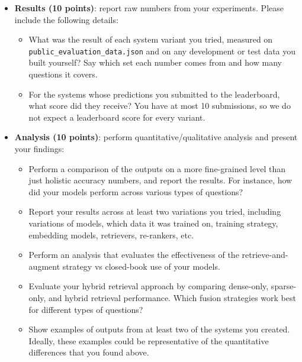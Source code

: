 \documentclass[11pt]{article}
\begin{document}
\begin{itemize}[leftmargin=2em]
\begin{itemize}[leftmargin=1.6em]
\begin{itemize}[nosep, leftmargin=1.4em]
            variations (more is welcome). This can include variations of models, which data it was
            trained on, training strategy, embedding models, retrievers, re-rankers, etc.
          \item What was your justification for trying these methods?
        \end{itemize}
      \item \textbf{Results (10 points)}: report raw numbers from your experiments. Please include the
        following details:
        \begin{itemize}[nosep, leftmargin=1.4em]
          \item What was the result of each system variant you tried, measured on
            \texttt{public\_evaluation\_data.json} and on any development or test data you built
            yourself? Say which set each number comes from and how many questions it covers.
          \item For the systems whose predictions you submitted to the leaderboard, what score did
            they receive? You have at most 10 submissions, so we do not expect a leaderboard score
            for every variant.
        \end{itemize}
      \item \textbf{Analysis (10 points)}: perform quantitative/qualitative analysis and present your
        findings:
        \begin{itemize}[nosep, leftmargin=1.4em]
          \item Perform a comparison of the outputs on a more fine-grained level than just holistic
            accuracy numbers, and report the results. For instance, how did your models perform across
            various types of questions?
          \item Report your results across at least two variations you tried, including variations of
            models, which data it was trained on, training strategy, embedding models, retrievers,
            re-rankers, etc.
          \item Perform an analysis that evaluates the effectiveness of the retrieve-and-augment
            strategy vs closed-book use of your models.
          \item Evaluate your hybrid retrieval approach by comparing dense-only, sparse-only, and
            hybrid retrieval performance. Which fusion strategies work best for different types of
            questions?
          \item Show examples of outputs from at least two of the systems you created. Ideally, these
            examples could be representative of the quantitative differences that you found above.
        \end{itemize}
    \end{itemize}
\end{itemize}
\end{document}
